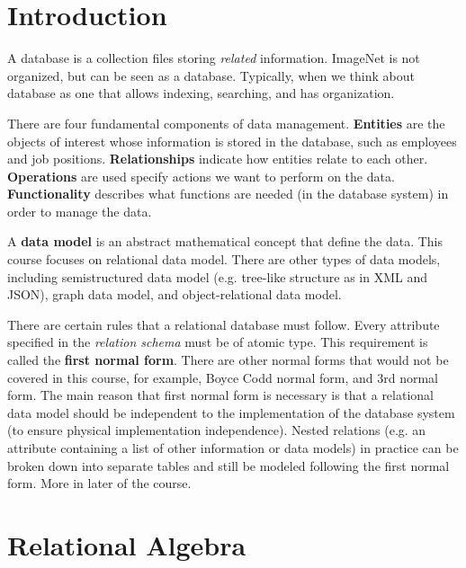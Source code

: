 \documentclass[12pt]{article}
\title{}
\begin{document}
\pagestyle{fancy}
\fancyhf{} %
\cfoot{\thepage}
\renewcommand{\headrulewidth}{1pt}

\section{Introduction}
A database is a collection files storing \emph{related} information. ImageNet is not organized, but can be seen as a database. Typically, when we think about database as one that allows indexing, searching, and has organization.

There are four fundamental components of data management. \textbf{Entities} are the objects of interest whose information is stored in the database, such as employees and job positions. \textbf{Relationships} indicate how entities relate to each other. \textbf{Operations} are used specify actions we want to perform on the data. \textbf{Functionality} describes what functions are needed (in the database system) in order to manage the data.

A \textbf{data model} is an abstract mathematical concept that define the data. This course focuses on relational data model. There are other types of data models, including semistructured data model (e.g. tree-like structure as in XML and JSON), graph data model, and object-relational data model.

There are certain rules that a relational database must follow. Every attribute specified in the \emph{relation schema} must be of atomic type. This requirement is called the \textbf{first normal form}. There are other normal forms that would not be covered in this course, for example, Boyce Codd normal form, and 3rd normal form. The main reason that first normal form is necessary is that a relational data model should be independent to the implementation of the database system (to ensure physical implementation independence). Nested relations (e.g. an attribute containing a list of other information or data models) in practice can be broken down into separate tables and still be modeled following the first normal form. More in later of the course.


\section{Relational Algebra}






\end{document}
